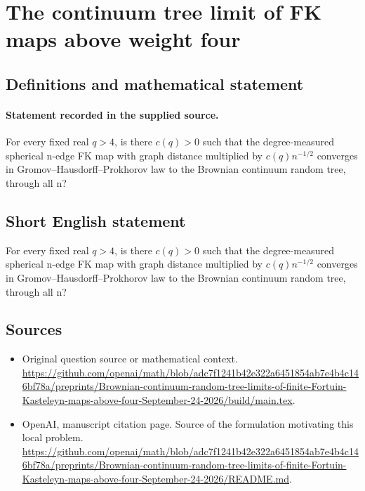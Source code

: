 \documentclass[11pt]{article}
\begin{document}
\section*{The continuum tree limit of FK maps above weight four}\label{30007358}
\subsection{Definitions and mathematical statement}
\paragraph{Statement recorded in the supplied source.}
For every fixed real $q>4$, is there $c(q)>0$ such that the degree-measured spherical n-edge FK map with graph distance multiplied by $c(q)n^{-1/2}$ converges in Gromov–Hausdorff–Prokhorov law to the Brownian continuum random tree, through all n?
\subsection{Short English statement}
For every fixed real $q>4$, is there $c(q)>0$ such that the degree-measured spherical n-edge FK map with graph distance multiplied by $c(q)n^{-1/2}$ converges in Gromov–Hausdorff–Prokhorov law to the Brownian continuum random tree, through all n?
\subsection{Sources}
\begin{itemize}
\item[S1] Original question source or mathematical context.
\url{https://github.com/openai/math/blob/adc7f1241b42e322a6451854ab7e4b4c146bf78a/preprints/Brownian-continuum-random-tree-limits-of-finite-Fortuin-Kasteleyn-maps-above-four-September-24-2026/build/main.tex}.
\item[S2] OpenAI, manuscript citation page. Source of the formulation motivating this local problem.
\url{https://github.com/openai/math/blob/adc7f1241b42e322a6451854ab7e4b4c146bf78a/preprints/Brownian-continuum-random-tree-limits-of-finite-Fortuin-Kasteleyn-maps-above-four-September-24-2026/README.md}.
\end{itemize}
\end{document}

